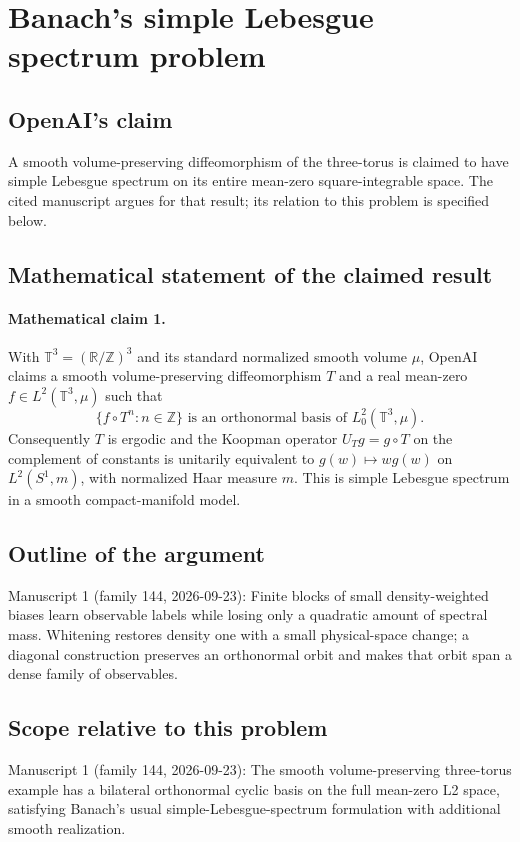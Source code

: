 \documentclass[11pt]{article}
\begin{document}
\section*{Banach's simple Lebesgue spectrum problem}

\subsection{OpenAI's claim}
A smooth volume-preserving diffeomorphism of the three-torus is claimed to have simple Lebesgue spectrum on its entire mean-zero square-integrable space. The cited manuscript argues for that result; its relation to this problem is specified below.

\subsection{Mathematical statement of the claimed result}
\paragraph{Mathematical claim 1.} With $\mathbb T^3=(\mathbb R/\mathbb Z)^3$ and its standard normalized smooth volume $\mu$, OpenAI claims a smooth volume-preserving diffeomorphism $T$ and a real mean-zero $f\in L^2(\mathbb T^3,\mu)$ such that
\[
\{f\circ T^n:n\in\mathbb Z\}\text{ is an orthonormal basis of }L^2_0(\mathbb T^3,\mu).
\]
Consequently $T$ is ergodic and the Koopman operator $U_Tg=g\circ T$ on the complement of constants is unitarily equivalent to $g(w)\mapsto wg(w)$ on $L^2(S^1,m)$, with normalized Haar measure $m$. This is simple Lebesgue spectrum in a smooth compact-manifold model.

\subsection{Outline of the argument}
Manuscript 1 (family 144, 2026-09-23): Finite blocks of small density-weighted biases learn observable labels while losing only a quadratic amount of spectral mass. Whitening restores density one with a small physical-space change; a diagonal construction preserves an orthonormal orbit and makes that orbit span a dense family of observables.

\subsection{Scope relative to this problem}
Manuscript 1 (family 144, 2026-09-23): The smooth volume-preserving three-torus example has a bilateral orthonormal cyclic basis on the full mean-zero L2 space, satisfying Banach’s usual simple-Lebesgue-spectrum formulation with additional smooth realization.
\end{document}
